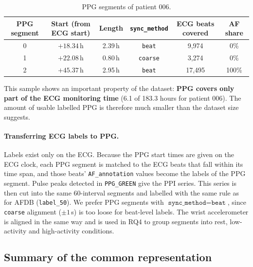 \documentclass[11pt]{article}
\newcommand{\var}[1]{\texttt{#1}}
\begin{document}
\begin{table}[ht]
\centering
\caption{PPG segments of patient 006.}
\label{tab:zen-sample}
\begin{tabular}{@{}cccccc@{}}
\toprule
PPG segment & Start (from ECG start) & Length & \var{sync\_method} &
ECG beats covered & AF share \\
\midrule
0 & $+18.34$\,h & 2.39\,h & \var{beat} & 9{,}974 & 0\% \\
1 & $+22.08$\,h & 0.80\,h & \var{coarse} & 3{,}274 & 0\% \\
2 & $+45.37$\,h & 2.95\,h & \var{beat} & 17{,}495 & 100\% \\
\bottomrule
\end{tabular}
\end{table}

This sample shows an important property of the dataset: \textbf{PPG covers
only part of the ECG monitoring time} (6.1 of 183.3 hours for patient 006).
The amount of usable labelled PPG is therefore much smaller than the dataset
size suggests.

\paragraph{Transferring ECG labels to PPG.} Labels exist only on the ECG.
Because the PPG start times are given on the ECG clock, each PPG segment is
matched to the ECG beats that fall within its time span, and those beats'
\var{AF\_annotation} values become the labels of the PPG segment. Pulse peaks
detected in \var{PPG\_GREEN} give the PPI series. This series is then cut into
the same 60-interval segments and labelled with the same rule as for AFDB
(\var{label\_50}). We prefer PPG segments with $\var{sync\_method} =
\var{beat}$, since \var{coarse} alignment ($\pm 1$\,s) is too loose for
beat-level labels. The wrist accelerometer is aligned in the same way and is
used in RQ4 to group segments into rest, low-activity and high-activity
conditions.

\subsection{Summary of the common representation}
\end{document}
